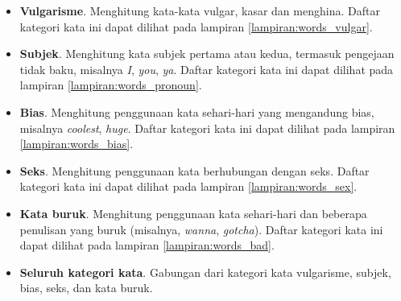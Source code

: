 \begin{itemize}
\item \textbf{Vulgarisme}.
Menghitung kata-kata vulgar, kasar dan menghina.
Daftar kategori kata ini dapat dilihat pada lampiran
\ref{lampiran:words_vulgar}.

\item \textbf{Subjek}.
Menghitung kata subjek pertama atau kedua, termasuk pengejaan tidak baku,
misalnya \textit{I}, \textit{you}, \textit{ya}.
Daftar kategori kata ini dapat dilihat pada lampiran
\ref{lampiran:words_pronoun}.

\item \textbf{Bias}.
Menghitung penggunaan kata sehari-hari yang mengandung bias, misalnya
\textit{coolest}, \textit{huge}.
Daftar kategori kata ini dapat dilihat pada lampiran
\ref{lampiran:words_bias}.

\item \textbf{Seks}.
Menghitung penggunaan kata berhubungan dengan seks.
Daftar kategori kata ini dapat dilihat pada lampiran
\ref{lampiran:words_sex}.

\item \textbf{Kata buruk}.
Menghitung penggunaan kata sehari-hari dan beberapa penulisan yang buruk
(misalnya, \textit{wanna}, \textit{gotcha}).
Daftar kategori kata ini dapat dilihat pada lampiran
\ref{lampiran:words_bad}.

\item \textbf{Seluruh kategori kata}.
Gabungan dari kategori kata vulgarisme, subjek, bias, seks, dan kata buruk.

\end{itemize}

